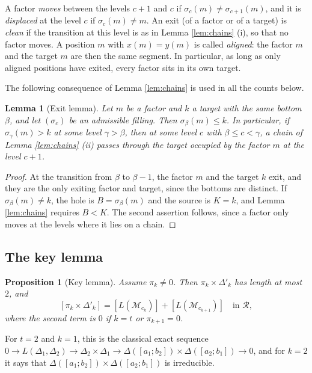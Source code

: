 \documentclass[a4paper,12pt,leqno]{amsart}
\newcommand{\caM}{\mathcal{M}}
\newcommand{\caR}{\mathcal{R}}
\theoremstyle{plain}
\newtheorem{lemma}[thm]{Lemma}
\newtheorem{prop}[thm]{Proposition}
\theoremstyle{definition}
\theoremstyle{definition}
\begin{document}
A factor \emph{moves}
between the levels $c+1$ and $c$ if $\sigma_c(m)\neq\sigma_{c+1}(m)$, and it is \emph{displaced} at
the level $c$ if $\sigma_c(m)\neq m$. An exit (of a factor or of a target) is \emph{clean} if the
transition at this level is as in Lemma \ref{lem:chains} (i), so that no factor moves.
A position $m$ with $x(m)=y(m)$ is called \emph{aligned}: the factor $m$ and the target $m$ are then
the same segment. In particular, as long as only aligned positions have exited, every factor sits in
its own target.

The following consequence of Lemma \ref{lem:chains} is used in all the counts below.

\begin{lemma}[Exit lemma]\label{lem:exit} Let $m$ be a factor and $k$ a target with the same bottom
$\beta$, and let $(\sigma_c)$ be an admissible filling. Then $\sigma_\beta(m)\leq k$. In particular, if
$\sigma_\gamma(m)>k$ at some level $\gamma>\beta$, then at some level $c$ with $\beta\leq c<\gamma$, a
chain of Lemma \ref{lem:chains} (ii) passes through the target occupied by the factor $m$ at the level
$c+1$.
\end{lemma}

\begin{proof}
At the transition from $\beta$ to $\beta-1$, the factor $m$ and the target $k$ exit, and they are the only
exiting factor and target, since the bottoms are distinct. If $\sigma_\beta(m)\neq k$, the hole is
$B=\sigma_\beta(m)$ and the source is $K=k$, and Lemma \ref{lem:chains} requires $B<K$. The second
assertion follows, since a factor only moves at the levels where it lies on a chain.
\end{proof}


\subsection{The key lemma}\label{ssec:key}
\begin{prop}[Key lemma]\label{conj:key} Assume $\pi_k\neq 0$. Then $\pi_k\times\Delta'_k$ has
length at most $2$, and
\[[\pi_k\times\Delta'_k]=[L(\caM_{c_k})]+[L(\caM_{c_{k+1}})]\quad\text{in } \caR,\]
where the second term is $0$ if $k=t$ or $\pi_{k+1}=0$.
\end{prop}

For $t=2$ and $k=1$, this is the classical exact sequence
 $0\rightarrow L(\Delta_1,\Delta_2)\rightarrow\Delta_2\times\Delta_1\rightarrow\Delta([a_1;b_2])\times\Delta([a_2;b_1])\rightarrow
 0$,
  and for $k=2$ it says that $\Delta([a_1;b_2])\times\Delta([a_2;b_1])$ is irreducible.
\end{document}
